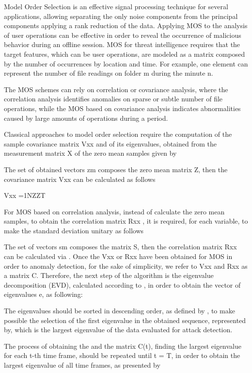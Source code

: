 \documentclass[twocolumn]{svjour3}          %
\begin{document}
Model Order Selection is an effective signal processing technique for several applications, allowing separating the only noise components from the principal components applying a rank reduction of the data. Applying MOS to the analysis of user operations can be effective in order to reveal the occurrence of malicious behavior during an offline session. MOS for threat intelligence requires that the target features, which can be user operations, are modeled as a matrix composed by the number of occurrences by location and time. For example, one element can represent the number of file readings on folder m during the minute n.

The MOS schemes can rely on correlation or covariance analysis, where the correlation analysis identifies anomalies on sparse or subtle number of file operations, while the MOS based on covariance analysis indicates abnormalities caused by large amounts of operations during a period.

Classical approaches to model order selection require the computation of the sample covariance matrix Vxx and of its eigenvalues, obtained from the measurement matrix X of the zero mean samples given by

The set of obtained vectors zm composes the zero mean matrix Z, then the covariance matrix Vxx can be calculated as follows 

Vxx =1NZZT

For MOS based on correlation analysis, instead of calculate the zero mean samples, to obtain the correlation matrix Rxx , it is required, for each variable, to make the standard deviation unitary as follows

The set of vectors sm composes the matrix S, then the correlation matrix Rxx can be calculated via 
. Once the Vxx or Rxx have been obtained for MOS in order to anomaly detection, for the sake of simplicity, we refer to Vxx and Rxx as a matrix C. Therefore, the next step of the algorithm is the eigenvalue decomposition (EVD), calculated according to , in order to obtain the vector of eigenvalues e, as following:



The eigenvalues should be sorted in descending order, as defined by , to make possible the selection of the first eigenvalue in the obtained sequence, represented by, which is the largest eigenvalue of the data evaluated for attack detection.

The process of obtaining the and the matrix C(t), finding the largest eigenvalue for each t-th time frame, should be repeated until t = T, in order to obtain the largest eigenvalue of all time frames, as presented by 
\end{document}
